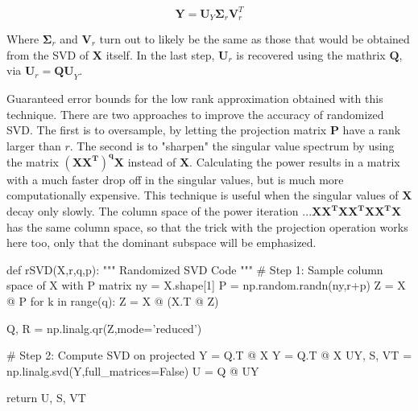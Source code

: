 \begin{equation}
\mathbf{Y} = \mathbf{U}_Y\mathbf{\Sigma}_r\mathbf{V}_r^T
\end{equation}

Where $\mathbf{\Sigma}_r$ and $\mathbf{V}_r$ turn out to likely be the same as those that would be obtained from the SVD of $\mathbf{X}$ itself. In the last step, $\mathbf{U}_r$ is recovered using the mathrix $\mathbf{Q}$, via $\mathbf{U}_r = \mathbf{QU}_Y$. 

Guaranteed error bounds for the low rank approximation obtained with this technique. There are two approaches to improve the accuracy of randomized SVD. The first is to oversample, by letting the projection matrix $\mathbf{P}$ have a rank larger than $r$. The second is to "sharpen" the singular value spectrum by using the matrix $\mathbf{(X X^T)^q X }$ instead of $\mathbf{X}$. Calculating the power results in a matrix with a much faster drop off in the singular values, but is much more computationally expensive. This technique is useful when the singular values of $\mathbf{X}$ decay only slowly. The column space of the power iteration $\mathbf{...X X^T X X^T X X^T X}$ has the same column space, so that the trick with the projection operation works here too, only that the dominant subspace will be emphasized.\\


\begin{python}
def rSVD(X,r,q,p):
    """
    Randomized SVD Code
    """
    # Step 1: Sample column space of X with P matrix
    ny = X.shape[1]
    P = np.random.randn(ny,r+p)
    Z = X @ P
    for k in range(q):
        Z = X @ (X.T @ Z)

    Q, R = np.linalg.qr(Z,mode='reduced')

    # Step 2: Compute SVD on projected Y = Q.T @ X
    Y = Q.T @ X
    UY, S, VT = np.linalg.svd(Y,full_matrices=False)
    U = Q @ UY

    return U, S, VT
\end{python}